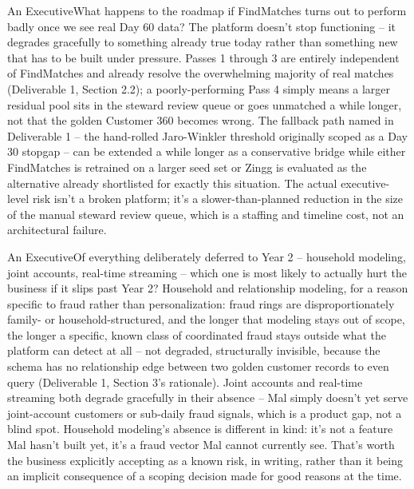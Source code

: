 \documentclass[11pt]{article}
\begin{document}
\begin{stakeholderq}{An Executive}{What happens to the roadmap if FindMatches turns out to perform badly once we see real Day 60 data?}
The platform doesn't stop functioning -- it degrades gracefully to something already true today rather than something new that has to be built under pressure. Passes 1 through 3 are entirely independent of FindMatches and already resolve the overwhelming majority of real matches (Deliverable 1, Section 2.2); a poorly-performing Pass 4 simply means a larger residual pool sits in the steward review queue or goes unmatched a while longer, not that the golden Customer 360 becomes wrong. The fallback path named in Deliverable 1 -- the hand-rolled Jaro-Winkler threshold originally scoped as a Day 30 stopgap -- can be extended a while longer as a conservative bridge while either FindMatches is retrained on a larger seed set or Zingg is evaluated as the alternative already shortlisted for exactly this situation. The actual executive-level risk isn't a broken platform; it's a slower-than-planned reduction in the size of the manual steward review queue, which is a staffing and timeline cost, not an architectural failure.
\end{stakeholderq}

\begin{stakeholderq}{An Executive}{Of everything deliberately deferred to Year 2 -- household modeling, joint accounts, real-time streaming -- which one is most likely to actually hurt the business if it slips past Year 2?}
Household and relationship modeling, for a reason specific to fraud rather than personalization: fraud rings are disproportionately family- or household-structured, and the longer that modeling stays out of scope, the longer a specific, known class of coordinated fraud stays outside what the platform can detect at all -- not degraded, structurally invisible, because the schema has no relationship edge between two golden customer records to even query (Deliverable 1, Section 3's rationale). Joint accounts and real-time streaming both degrade gracefully in their absence -- Mal simply doesn't yet serve joint-account customers or sub-daily fraud signals, which is a product gap, not a blind spot. Household modeling's absence is different in kind: it's not a feature Mal hasn't built yet, it's a fraud vector Mal cannot currently see. That's worth the business explicitly accepting as a known risk, in writing, rather than it being an implicit consequence of a scoping decision made for good reasons at the time.
\end{stakeholderq}
\end{document}
